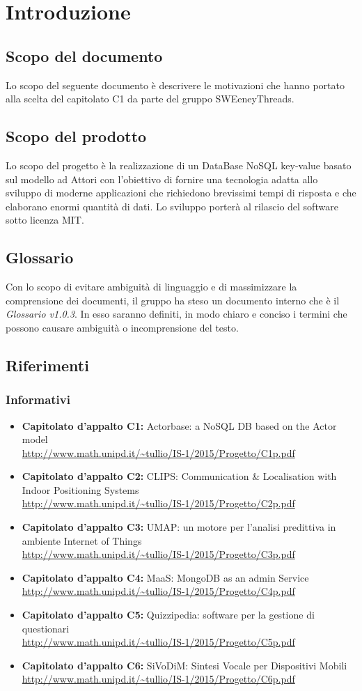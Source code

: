 \documentclass[a4paper]{report}
\newcommand{\mychapter}[2]{
	\setcounter{chapter}{#1}
	\setcounter{section}{0}
	\setcounter{subsection}{1}
	\chapter*{#2}
	\addcontentsline{toc}{chapter}{#2}
}
\begin{document}
	\mychapter{1}{Introduzione}
	\section{Scopo del documento}
		Lo scopo del seguente documento è descrivere le motivazioni che hanno portato alla scelta del 
		capitolato C1 da parte del gruppo SWEeneyThreads. 
	\section{Scopo del prodotto}
		Lo scopo del progetto è la realizzazione di un DataBase NoSQL key-value basato sul modello ad 
		Attori con l'obiettivo di fornire una tecnologia adatta allo sviluppo di moderne 
		applicazioni che richiedono brevissimi tempi di risposta e che elaborano enormi quantità 
		di dati. Lo sviluppo porterà al rilascio del software sotto licenza MIT.
	\section{Glossario}
		Con lo scopo di evitare ambiguità di linguaggio e di massimizzare la comprensione dei documenti, il 
      gruppo ha steso un documento interno che è il \emph{Glossario v1.0.3}. In esso saranno definiti, in modo
      chiaro e conciso i termini che possono causare ambiguità o incomprensione del testo.
	\section{Riferimenti}
	\subsection{Informativi}	
		\begin{itemize}
			\item \textbf{Capitolato d'appalto C1:} Actorbase: a NoSQL DB based on the Actor model \\
			\url{http://www.math.unipd.it/~tullio/IS-1/2015/Progetto/C1p.pdf}
			\item \textbf{Capitolato d'appalto C2:} CLIPS: Communication \& Localisation with Indoor
			 Positioning Systems \\
			\url{http://www.math.unipd.it/~tullio/IS-1/2015/Progetto/C2p.pdf}
			\item \textbf{Capitolato d'appalto C3:} UMAP: un motore per l'analisi predittiva in ambiente
			 Internet of Things \\
			\url{http://www.math.unipd.it/~tullio/IS-1/2015/Progetto/C3p.pdf}
			\item \textbf{Capitolato d'appalto C4:} MaaS: MongoDB as an admin Service \\
			\url{http://www.math.unipd.it/~tullio/IS-1/2015/Progetto/C4p.pdf}
			\item \textbf{Capitolato d'appalto C5:} Quizzipedia: software per la gestione di questionari \\
			\url{http://www.math.unipd.it/~tullio/IS-1/2015/Progetto/C5p.pdf}
			\item \textbf{Capitolato d'appalto C6:} SiVoDiM: Sintesi Vocale per Dispositivi Mobili \\
			\url{http://www.math.unipd.it/~tullio/IS-1/2015/Progetto/C6p.pdf}
		\end{itemize}
\end{document}
